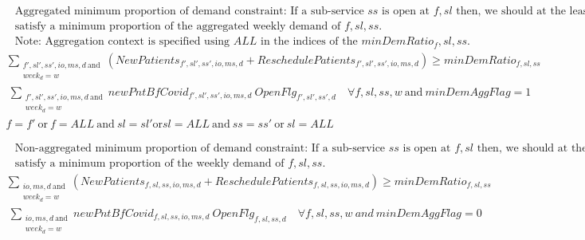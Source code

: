 \documentclass[10pt, letterpaper]{article}
\begin{document}
\begin{align*}
&\text{Aggregated minimum proportion of demand constraint: If a sub-service $ss$ is open at $f,sl$ then, we should at the least} \\
&\text{satisfy a minimum proportion of the aggregated weekly demand of $f,sl,ss$.} \\
&\text{Note: Aggregation context is specified using $ALL$ in the indices of the $minDemRatio_f,sl,ss$.} 
\end{align*}
\begin{equation} 
\begin{multlined}
\sum_{\substack{f',sl',ss',io,ms,d \ \text{and} \\
week_{d} = w }} (NewPatients_{f',sl',ss',io,ms,d} + ReschedulePatients_{f',sl',ss',io,ms,d})
\geq  minDemRatio_{f,sl,ss} \\ \ \sum_{\substack{f',sl',ss',io,ms,d \ \text{and} \\
week_{d} = w }} newPntBfCovid_{f',sl',ss',io,ms,d} \ OpenFlg_{f',sl',ss',d} \quad \forall f,sl,ss,w \ \text{and} \ minDemAggFlag = 1 \\
f = f' \ \text{or} \ f = ALL \ \text{and} \ sl = sl' \text{or} sl = ALL \ \text{and} \ ss=ss' \ \text{or} \ sl = ALL
\end{multlined}
\end{equation}

\begin{align*}
&\text{Non-aggregated minimum proportion of demand constraint: If a sub-service $ss$ is open at $f,sl$ then, we should at the least} \\
&\text{satisfy a minimum proportion of the weekly demand of $f,sl,ss$.} 
\end{align*}
\begin{equation} 
\begin{multlined}
\sum_{\substack{io,ms,d \ \text{and} \\
week_{d} = w }} (NewPatients_{f,sl,ss,io,ms,d} + ReschedulePatients_{f,sl,ss,io,ms,d})
\geq  minDemRatio_{f,sl,ss} \\ \ \sum_{\substack{io,ms,d \ \text{and} \\
week_{d} = w }} newPntBfCovid_{f,sl,ss,io,ms,d} \ OpenFlg_{f,sl,ss,d} \quad \forall f,sl,ss,w \ and \ minDemAggFlag = 0\
\end{multlined}
\end{equation}

\pagebreak
\end{document}
